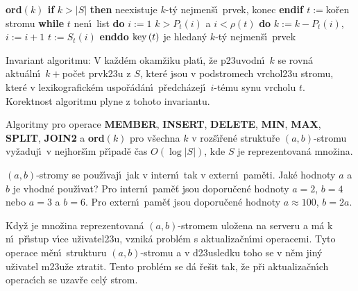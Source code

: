 {\bf ord$\left(k\right)$\newline 
if} $k>|S|$ {\bf then} neexistuje $k$-t\'y nejmen\v s\'\i\ prvek, konec 
{\bf endif\newline 
$t:=$}ko\v ren stromu\newline 
{\bf while} $t$ nen\'\i\ list {\bf do}\newline 
\phantom{---}$i:=1$\newline 
\phantom{---}{\bf while} $k>P_t\left(i\right)$ a $i<\rho \left(t\right)$ {\bf do}\newline 
\phantom{------}$k:=k-P_t\left(i\right)$, $i:=i+1$\newline 
\phantom{---}{\bf enddo}\newline 
\phantom{---}$t:=S_t\left(i\right)$\newline 
{\bf enddo}\newline 
$\operatorname{key}\left(t\right)$ je hledan\'y $k$-t\'y nejmen\v s\'\i\ prvek
\bigskip

\flushpar Invariant algoritmu: V ka\v zd\'em okam\v ziku plat\'\i , 
\v ze p\accent23uvodn\'\i\ $k$ se rovn\'a aktu\'aln\'\i\ $k+$po\v cet prvk\accent23u z 
$S$, kter\'e jsou v podstromech vrchol\accent23u stromu, kter\'e v 
lexikografick\'em uspo\v r\'ad\'an\'\i\ p\v redch\'azej\'\i\ $i$-t\'emu synu 
vrcholu $t$. Korektnost algoritmu plyne z tohoto 
invariantu.


Algoritmy pro operace {\bf MEMBER}, {\bf INSERT}, 
{\bf DE\-LETE}, {\bf MIN}, {\bf MAX}, {\bf SPLIT}, {\bf JOIN2} a {\bf ord$
\left(k\right)$} pro v\v sechna $k$ v 
roz\v s\'\i\v ren\'e struktu\v re $\left(a,b\right)$-stromu vy\-\v za\-duj\'\i\ v 
nejhor\v s\'\i m p\v r\'\i\-pa\-d\v e \v cas $O\left(\log|S|\right)$, kde $S$ je reprezentovan\'a 
mno\v zina.  
\endproclaim


\flushpar $\left(a,b\right)$-stromy se pou\v z\'\i vaj\'\i\ jak v intern\'\i\ tak v 
extern\'\i\ pam\v eti. Jak\'e hodnoty $a$ a $b$ je vhodn\'e 
pou\v z\'\i vat?\newline 
Pro intern\'\i\ pam\v e\v t jsou doporu\v cen\'e hodnoty $a=2$, $
b=4$ 
nebo $a=3$ a $b=6$.\newline 
Pro extern\'\i\ pam\v e\v t jsou doporu\v cen\'e hodnoty $a\approx 
100$, 
$b=2a$.
\medskip

\flushpar Kdy\v z je mno\v zina reprezentovan\'a $\left(a,b\right)$-stromem 
ulo\v zena na serveru a m\'a k n\'\i\ p\v r\'\i stup v\'\i ce 
u\v zivatel\accent23u, vznik\'a probl\'em s aktualiza\v cn\'\i mi 
operacemi. Tyto operace m\v en\'\i\ strukturu $\left(a,b\right)$-stromu a 
v d\accent23usledku toho se v n\v em jin\'y u\v zivatel 
m\accent23u\v ze ztratit. Tento probl\'em se d\'a  
\v re\v sit tak, \v ze p\v ri aktu\-aliza\v cn\'\i ch operac\'\i ch 
se uzav\v re cel\'y strom.
\medskip 

